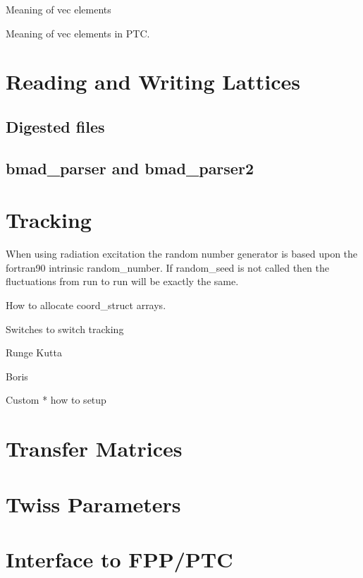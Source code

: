 \documentclass{book}
\begin{document}
  Meaning of vec elements

  Meaning of vec elements in PTC.

\chapter{Reading and Writing Lattices}

\section{Digested files}

\section{bmad\_parser and bmad\_parser2}

\chapter{Tracking}

When using radiation excitation the random number generator is based
upon the fortran90 intrinsic random\_number. If random\_seed is not called
then the fluctuations from run to run will be exactly the same.


How to allocate coord\_struct arrays. 

  Switches to switch tracking

  Runge Kutta

  Boris

  Custom
    * how to setup



\chapter{Transfer Matrices}

\chapter{Twiss Parameters}

\chapter{Interface to FPP/PTC}
\end{document}
